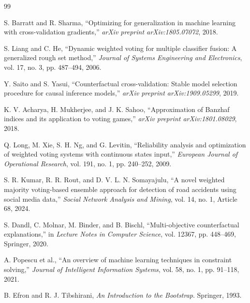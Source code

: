 \documentclass{mcmthesis}
\begin{document}
\newpage
\label{lastpage:preAI}
\begin{thebibliography}{99}

 S. Barratt and R. Sharma, ``Optimizing for generalization in machine learning with cross-validation gradients,'' \textit{arXiv preprint arXiv:1805.07072}, 2018.

 S. Liang and C. He, ``Dynamic weighted voting for multiple classifier fusion: A generalized rough set method,'' \textit{Journal of Systems Engineering and Electronics}, vol. 17, no. 3, pp. 487--494, 2006.

 Y. Saito and S. Yasui, ``Counterfactual cross-validation: Stable model selection procedure for causal inference models,'' \textit{arXiv preprint arXiv:1909.05299}, 2019.

 K. V. Acharya, H. Mukherjee, and J. K. Sahoo, ``Approximation of Banzhaf indices and its application to voting games,'' \textit{arXiv preprint arXiv:1801.08029}, 2018.

 Q. Long, M. Xie, S. H. Ng, and G. Levitin, ``Reliability analysis and optimization of weighted voting systems with continuous states input,'' \textit{European Journal of Operational Research}, vol. 191, no. 1, pp. 240--252, 2009.

 S. R. Kumar, R. R. Rout, and D. V. L. N. Somayajulu, ``A novel weighted majority voting-based ensemble approach for detection of road accidents using social media data,'' \textit{Social Network Analysis and Mining}, vol. 14, no. 1, Article 68, 2024.

 S. Dandl, C. Molnar, M. Binder, and B. Bischl, ``Multi-objective counterfactual explanations,'' in \textit{Lecture Notes in Computer Science}, vol. 12367, pp. 448--469, Springer, 2020.

 A. Popescu et al., ``An overview of machine learning techniques in constraint solving,'' \textit{Journal of Intelligent Information Systems}, vol. 58, no. 1, pp. 91--118, 2021.

 B. Efron and R. J. Tibshirani, \textit{An Introduction to the Bootstrap}. Springer, 1993.

\end{thebibliography}
\end{document}
